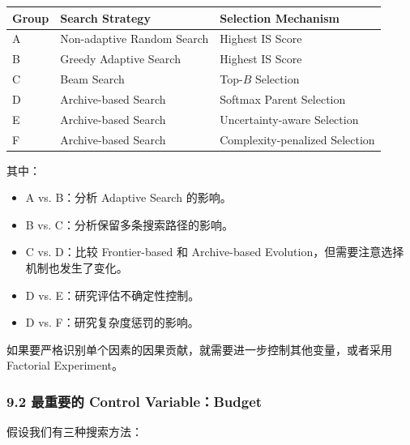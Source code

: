 \begin{readertable}
\begin{longtable}[]{@{}
  >{\raggedright\arraybackslash}p{}
  >{\raggedright\arraybackslash}p{}
  >{\raggedright\arraybackslash}p{}@{}}
\toprule
Group & Search Strategy & Selection Mechanism \\
\midrule
\endhead
A & Non-adaptive Random Search & Highest IS Score \\
B & Greedy Adaptive Search & Highest IS Score \\
C & Beam Search & Top-\(B\) Selection \\
D & Archive-based Search & Softmax Parent Selection \\
E & Archive-based Search & Uncertainty-aware Selection \\
F & Archive-based Search & Complexity-penalized Selection \\
\bottomrule
\end{longtable}
\end{readertable}

其中：

\begin{itemize}
\tightlist
\item
  A vs. B：分析 Adaptive Search 的影响。
\item
  B vs. C：分析保留多条搜索路径的影响。
\item
  C vs. D：比较 Frontier-based 和 Archive-based Evolution，但需要注意选择机制也发生了变化。
\item
  D vs. E：研究评估不确定性控制。
\item
  D vs. F：研究复杂度惩罚的影响。
\end{itemize}

如果要严格识别单个因素的因果贡献，就需要进一步控制其他变量，或者采用 Factorial Experiment。

\hypertarget{part-3-40-0001-ux6700ux91cdux8981ux7684-control-variablebudget}{%
\subsubsection{9.2 最重要的 Control Variable：Budget}\label{part-3-40-0001-ux6700ux91cdux8981ux7684-control-variablebudget}}

假设我们有三种搜索方法：

